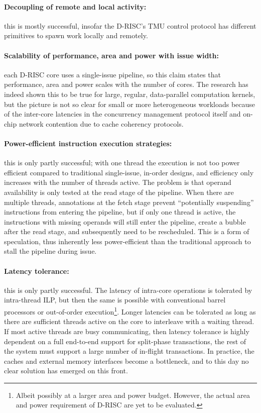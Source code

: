\paragraph{Decoupling of remote and local activity:} this is mostly successful, insofar the D-RISC's TMU control protocol
has different primitives to spawn work locally and remotely. 

\paragraph{Scalability of performance, area and power with issue width:} each D-RISC core uses a single-issue pipeline,
so this claim states that performance, area and power scales with the number of cores. The research has indeed
shown this to be true for large, regular, data-parallel computation kernels, but the picture is not so clear for
small or more heterogeneous workloads because of the inter-core latencies in the concurrency management protocol itself
and on-chip network contention due to cache coherency protocols.

\paragraph{Power-efficient instruction execution strategies:} this is only partly successful; with one thread
the execution is not too power efficient compared to traditional
single-issue, in-order designs, and efficiency only increases with the number of threads
active. The problem is that operand availability is only tested at the
read stage of the pipeline. When there are multiple threads,
annotations at the fetch stage prevent ``potentially suspending''
instructions from entering the pipeline, but if only one thread is
active, the instructions with missing operands will still enter the
pipeline, create a bubble after the read stage, and subsequently need
to be rescheduled. This is a form of speculation, thus inherently less
power-efficient than the traditional approach to stall the pipeline during
issue.


\paragraph{Latency tolerance:} this is only partly successful. The latency of intra-core operations is tolerated by intra-thread ILP, but then the same is possible with conventional barrel processors or out-of-order execution\footnote{Albeit possibly at a larger area and power budget. However, the actual area and power requirement of D-RISC are yet to be evaluated.}. Longer latencies can be tolerated as long as there are sufficient threads active on the core to interleave with a waiting thread. If most active threads are busy communicating, then latency tolerance is highly dependent on a full end-to-end support for split-phase transactions, \ie the rest of the system must support
a large number of in-flight transactions. In practice, the caches and
external memory interfaces become a bottleneck, and to this day no clear solution has emerged on this front. 

